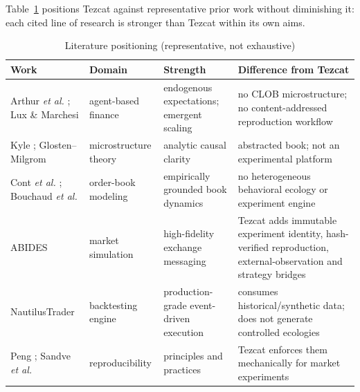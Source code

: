 \documentclass[conference]{IEEEtran}
\newcommand{\tez}{Tezcat}
\begin{document}
Table~\ref{tab:gap} positions \tez{} against representative prior work
without diminishing it: each cited line of research is stronger than
\tez{} within its own aims.

\begin{table}[t]
\caption{Literature positioning (representative, not exhaustive)}
\label{tab:gap}
\centering
\scriptsize
\setlength{\tabcolsep}{3pt}
\begin{tabular}{>{\raggedright\arraybackslash}p{1.5cm}>{\raggedright\arraybackslash}p{1.3cm}>{\raggedright\arraybackslash}p{2.05cm}>{\raggedright\arraybackslash}p{2.3cm}}
\toprule
\textbf{Work} & \textbf{Domain} & \textbf{Strength} &
\textbf{Difference from \tez{}} \\
\midrule
Arthur \emph{et al.} \cite{arthur1997}; Lux \& Mar\-che\-si \cite{lux1999} &
agent-based finance & endogenous expectations; emergent scaling &
no CLOB microstructure; no content-addressed reproduction workflow \\
Kyle \cite{kyle1985}; Glosten--Milgrom \cite{glosten1985} &
micro\-structure theory & analytic causal clarity &
abstracted book; not an experimental platform \\
Cont \emph{et al.} \cite{cont2010}; Bouchaud \emph{et al.}
\cite{bouchaud2002} & order-book modeling & empirically grounded book
dynamics & no heterogeneous behavioral ecology or experiment engine \\
ABIDES \cite{byrd2020} & market simulation & high-fidelity exchange
messaging & \tez{} adds immutable experiment identity, hash-verified
reproduction, external-observation and strategy bridges \\
Nautilus\-Trader \cite{nautilustrader} & backtesting engine &
production-grade event-driven execution & consumes historical/synthetic
data; does not generate controlled ecologies \\
Peng \cite{peng2011}; Sandve \emph{et al.} \cite{sandve2013} &
reproduci\-bility & principles and practices & \tez{} enforces them
mechanically for market experiments \\
\bottomrule
\end{tabular}
\end{table}
\end{document}
